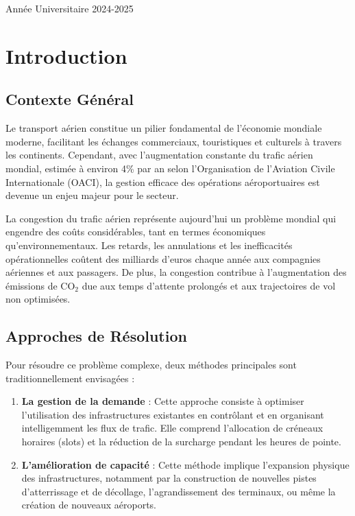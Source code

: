 \documentclass[12pt,a4paper]{article}
\begin{document}
\begin{titlepage}
    \vfill

    {\large\color{darkblue} Année Universitaire 2024-2025\par}
\end{titlepage}

\tableofcontents
\thispagestyle{empty}
\newpage
\setcounter{page}{1}

\section{Introduction}

\subsection{Contexte Général}

Le transport aérien constitue un pilier fondamental de l'économie mondiale moderne, facilitant les échanges commerciaux, touristiques et culturels à travers les continents. Cependant, avec l'augmentation constante du trafic aérien mondial, estimée à environ 4\% par an selon l'Organisation de l'Aviation Civile Internationale (OACI), la gestion efficace des opérations aéroportuaires est devenue un enjeu majeur pour le secteur.

La congestion du trafic aérien représente aujourd'hui un problème mondial qui engendre des coûts considérables, tant en termes économiques qu'environnementaux. Les retards, les annulations et les inefficacités opérationnelles coûtent des milliards d'euros chaque année aux compagnies aériennes et aux passagers. De plus, la congestion contribue à l'augmentation des émissions de CO$_2$ due aux temps d'attente prolongés et aux trajectoires de vol non optimisées.

\subsection{Approches de Résolution}

Pour résoudre ce problème complexe, deux méthodes principales sont traditionnellement envisagées :

\begin{enumerate}[leftmargin=*, label=\textcolor{primaryblue}{\textbf{\arabic*.}}]
    \item \textbf{La gestion de la demande} : Cette approche consiste à optimiser l'utilisation des infrastructures existantes en contrôlant et en organisant intelligemment les flux de trafic. Elle comprend l'allocation de créneaux horaires (slots) et la réduction de la surcharge pendant les heures de pointe.

    \item \textbf{L'amélioration de capacité} : Cette méthode implique l'expansion physique des infrastructures, notamment par la construction de nouvelles pistes d'atterrissage et de décollage, l'agrandissement des terminaux, ou même la création de nouveaux aéroports.
\end{enumerate}
\end{document}
